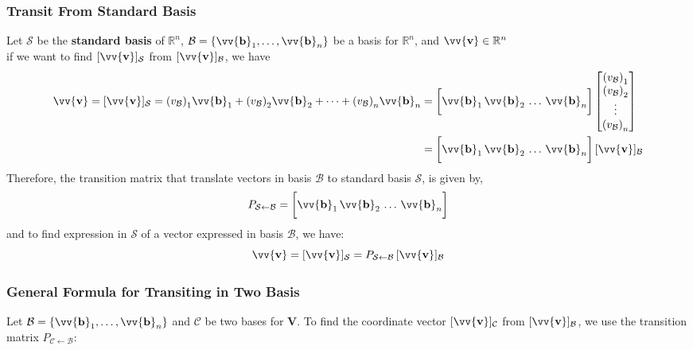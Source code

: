 \documentclass[11pt]{article}
\DeclareRobustCommand{\myvec}[1]{\vv{\mathbf{#1}}}
\newcommand{\mysubvecsp}[1]{\bm{{#1}}}
\newcommand{\myset}[1]{\mathcal{#1}}
\newcommand{\mymat}[1]{#1}
\begin{document}
    \subsubsection{Transit From Standard Basis}
    Let $\myset{S}$ be the \textbf{standard basis} of $\mathbb{R}^n$, $\myset{B} = \{\myvec{b}_1, \dots, \myvec{b}_n\}$ be a basis for $\mathbb{R}^n$, and $\myvec{v} \in \mathbb{R}^n$\\
    if we want to find $[\myvec{v}]_\myset{S}$ from $[\myvec{v}]_\myset{B}$, we have
    \begin{align*}
    \myvec{v} = [\myvec{v}]_{\myset{S}} = {(v_\myset{B})}_1\myvec{b}_1 + {(v_\myset{B})}_2\myvec{b}_2 + \dots + {(v_\myset{B})}_n\myvec{b}_n 
        & = \bigg[ \myvec{b}_1 \, \myvec{b}_2 \, \dots \, \myvec{b}_n \bigg] 
        \begin{bmatrix} {(v_\myset{B})}_1 \\ {(v_\myset{B})}_2 \\ \vdots \\ {(v_\myset{B})}_n \end{bmatrix} \\
        & = \bigg[ \myvec{b}_1 \, \myvec{b}_2 \, \dots \, \myvec{b}_n \bigg]\,[\myvec{v}]_\myset{B}
    \end{align*}
    Therefore, the transition matrix that translate vectors in basis $\myset{B}$ to standard basis $\myset{S}$, is given by,
    \begin{equation}
        \mymat{P}_{\myset{S}\leftarrow\myset{B}} = \bigg[ \myvec{b}_1 \, \myvec{b}_2 \, \dots \, \myvec{b}_n \bigg]
    \end{equation} 
    and to find expression in $\myset{S}$ of a vector expressed in basis $\myset{B}$, we have:
    \begin{equation}
        \myvec{v} = [\myvec{v}]_{\myset{S}} = \mymat{P}_{\myset{S}\leftarrow\myset{B}} \, [\myvec{v}]_{\myset{B}}
    \end{equation}
        
    \subsubsection{General Formula for Transiting in Two Basis}

    Let $\myset{B} = \{\myvec{b}_1, \dots, \myvec{b}_n\}$ and $\myset{C}$ be two bases for $\mysubvecsp{V}$.
    To find the coordinate vector $[\myvec{v}]_{\myset{C}}$ from $[\myvec{v}]_{\myset{B}}$, we use the transition matrix $\mymat{P}_{\myset{C} \leftarrow \myset{B}}$:
\end{document}
